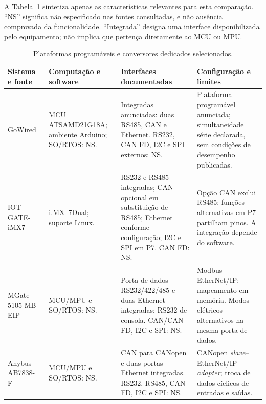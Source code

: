 A Tabela~\ref{tab:plataformas-multiprotocolo} sintetiza apenas as
características relevantes para esta comparação. \enquote{NS} significa
não especificado nas fontes consultadas, e não ausência comprovada
da funcionalidade. \enquote{Integrada} designa uma interface disponibilizada
pelo equipamento; não implica que pertença diretamente ao MCU ou MPU.

\begin{table}[htbp]
    \centering
    \small
    \setlength{\tabcolsep}{4pt}
    \renewcommand{\arraystretch}{1.12}
    \caption{Plataformas programáveis e conversores dedicados selecionados.}
    \label{tab:plataformas-multiprotocolo}
    \begin{tabularx}{\textwidth}{@{}>{\raggedright\arraybackslash}p{}*{3}{>{\raggedright\arraybackslash}X}@{}}
        \toprule
        Sistema e fonte & Computação e software & Interfaces documentadas & Configuração e limites \\
        \midrule
        GoWired~\cite{domatic_gowired}
        & MCU ATSAMD21G18A; ambiente Arduino; SO/RTOS: NS.
        & Integradas anunciadas: duas RS485, CAN e Ethernet.
        RS232, CAN FD, I2C e SPI externos: NS.
        & Plataforma programável anunciada; simultaneidade série declarada,
        sem condições de desempenho publicadas. \\
        \addlinespace
        IOT-GATE-iMX7~\cite{compulab_imx7,compulab_imx7_manual_2018}
        & i.MX~7Dual; suporte Linux.
        & RS232 e RS485 integradas; CAN opcional em substituição de RS485;
        Ethernet conforme configuração; I2C e SPI em P7. CAN FD: NS.
        & Opção CAN exclui RS485; funções alternativas em P7 partilham
        pinos. A integração depende do software. \\
        \addlinespace
        MGate 5105-MB-EIP~\cite{moxa_mgate5105}
        & MCU/MPU e SO/RTOS: NS.
        & Porta de dados RS232/422/485 e duas Ethernet integradas;
        RS232 de consola. CAN/CAN FD, I2C e SPI: NS.
        & Modbus--EtherNet/IP; mapeamento em memória.
        Modos elétricos alternativos na mesma porta de dados. \\
        \addlinespace
        Anybus AB7838-F~\cite{hms_ab7838}
        & MCU/MPU e SO/RTOS: NS.
        & CAN para CANopen e duas portas Ethernet integradas.
        RS232, RS485, CAN FD, I2C e SPI: NS.
        & CANopen \textit{slave}--EtherNet/IP \textit{adapter};
        troca de dados cíclicos de entradas e saídas. \\
        \bottomrule
    \end{tabularx}
\end{table}

